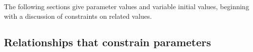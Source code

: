 









The following sections give parameter values and variable initial values, beginning with a discussion of constraints on related values. %


\subsection{Relationships that constrain parameters }

